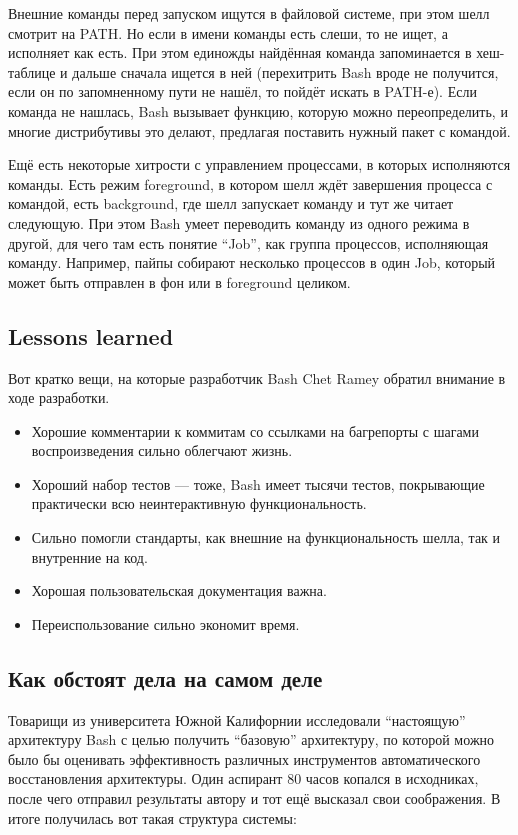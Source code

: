 \documentclass[a5paper]{article}
\begin{document}
Внешние команды перед запуском ищутся в файловой системе, при этом шелл смотрит на PATH. Но если в имени команды есть слеши, то не  ищет, а исполняет как есть. При этом единожды найдённая команда запоминается в хеш-таблице и дальше сначала ищется в ней (перехитрить Bash вроде не получится, если он по запомненному пути не нашёл, то пойдёт искать в PATH-е). Если команда не нашлась, Bash вызывает функцию, которую можно переопределить, и многие дистрибутивы это делают, предлагая поставить нужный пакет с командой.

Ещё есть некоторые хитрости с управлением процессами, в которых исполняются команды. Есть режим foreground, в котором шелл ждёт завершения процесса с командой, есть background, где шелл запускает команду и тут же читает следующую. При этом Bash умеет переводить команду из одного режима в другой, для чего там есть понятие ``Job'', как группа процессов, исполняющая команду. Например, пайпы собирают несколько процессов в один Job, который может быть отправлен в фон или в foreground целиком.

\subsection{Lessons learned}

Вот кратко вещи, на которые разработчик Bash Chet Ramey обратил внимание в ходе разработки.

\begin{itemize}
	\item Хорошие комментарии к коммитам со ссылками на багрепорты с шагами воспроизведения сильно облегчают жизнь.
	\item Хороший набор тестов --- тоже, Bash имеет тысячи тестов, покрывающие практически всю неинтерактивную функциональность.
	\item Сильно помогли стандарты, как внешние на функциональность шелла, так и внутренние на код.
	\item Хорошая пользовательская документация важна.
	\item Переиспользование сильно экономит время.
\end{itemize}

\subsection{Как обстоят дела на самом деле}

Товарищи из университета Южной Калифорнии исследовали ``настоящую'' архитектуру Bash с целью получить ``базовую'' архитектуру, по которой можно было бы оценивать эффективность различных инструментов автоматического восстановления архитектуры. Один аспирант 80 часов копался в исходниках, после чего отправил результаты автору и тот ещё высказал свои соображения. В итоге получилась вот такая структура системы:
\end{document}
